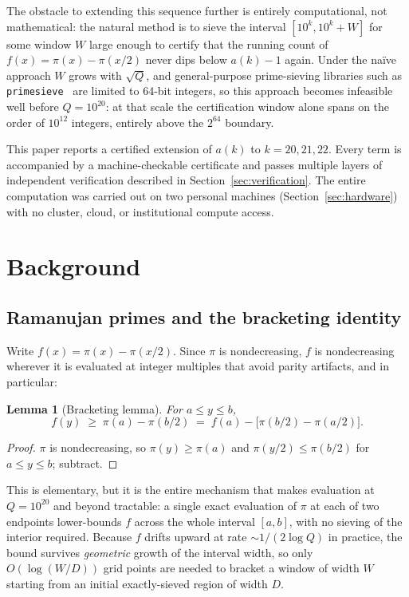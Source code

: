 \documentclass[11pt]{amsart}
\newtheorem{lemma}{Lemma}
\newcommand{\pcount}{\pi}
\begin{document}
The obstacle to extending this sequence further is entirely
computational, not mathematical: the natural method is to sieve the
interval $[10^k, 10^k + W]$ for some window $W$ large enough to certify
that the running count of $f(x) = \pcount(x) - \pcount(x/2)$ never dips
below $a(k)-1$ again. Under the na\"ive approach $W$ grows with $\sqrt{Q}$,
and general-purpose prime-sieving libraries such as
\texttt{primesieve}~\cite{primesieve} are limited to 64-bit integers, so
this approach becomes infeasible well before $Q = 10^{20}$: at that scale
the certification window alone spans on the order of $10^{12}$
integers, entirely above the $2^{64}$ boundary.

This paper reports a certified extension of $a(k)$ to $k=20,21,22$.
Every term is accompanied by a machine-checkable certificate and passes
multiple layers of independent verification described in
Section~\ref{sec:verification}. The entire computation was carried out
on two personal machines (Section~\ref{sec:hardware}) with no cluster,
cloud, or institutional compute access.

\section{Background}
\label{sec:background}

\subsection{Ramanujan primes and the bracketing identity}

Write $f(x) = \pcount(x) - \pcount(x/2)$. Since $\pcount$ is
nondecreasing, $f$ is nondecreasing wherever it is evaluated at integer
multiples that avoid parity artifacts, and in particular:

\begin{lemma}[Bracketing lemma]
\label{lem:bracket}
For $a \leq y \leq b$,
\[
  f(y) \;\geq\; \pcount(a) - \pcount(b/2) \;=\; f(a) - \bigl[\pcount(b/2) -
  \pcount(a/2)\bigr].
\]
\end{lemma}

\begin{proof}
$\pcount$ is nondecreasing, so $\pcount(y) \geq \pcount(a)$ and
$\pcount(y/2) \leq \pcount(b/2)$ for $a \leq y \leq b$; subtract.
\end{proof}

This is elementary, but it is the entire mechanism that makes evaluation
at $Q = 10^{20}$ and beyond tractable: a single exact evaluation of
$\pcount$ at each of two endpoints lower-bounds $f$ across the whole
interval $[a,b]$, with no sieving of the interior required. Because $f$
drifts upward at rate $\sim 1/(2\log Q)$ in practice, the bound survives
\emph{geometric} growth of the interval width, so only
$O(\log(W/D))$ grid points are needed to bracket a window of width $W$
starting from an initial exactly-sieved region of width $D$.
\end{document}
